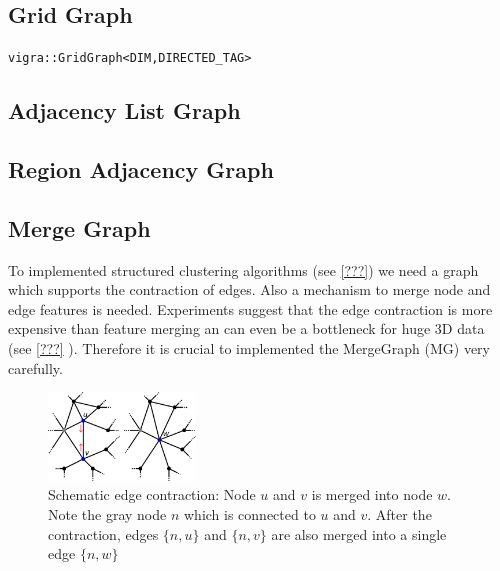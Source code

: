 \subsection{Grid Graph} \label{sec:graphs_grid_graph}


    \lstinline{vigra::GridGraph<DIM,DIRECTED_TAG>}

\subsection{Adjacency List Graph} \label{sec:graphs_adjacency_list_graph}

\subsection{Region Adjacency Graph} \label{sec:graphs_rag}


\subsection{Merge Graph} \label{sec:graphs_merge_graph}
To implemented structured clustering algorithms (see \cref{???}) we
need a graph which supports the contraction of edges.
Also a mechanism to merge node and edge features is needed.
Experiments suggest that the edge contraction is more expensive
than feature merging an can even be a bottleneck for huge 3D data 
(see \cref{???} ).
Therefore it is crucial to implemented the MergeGraph (MG) very carefully.
\begin{figure}
    \centering
    \includegraphics[width=0.35\textwidth]{fig/contraction.pdf}
    \caption{ Schematic edge contraction: Node $u$ and $v$ is merged into node $w$.
        Note the gray node $n$ which is connected to $u$ and $v$.
        After the contraction, edges $\{ n,u\}$ and $\{ n,v\}$ are also merged into 
        a single edge $\{ n, w\}$ 
    }
    \label{fig:figlabel}
\end{figure}


   

